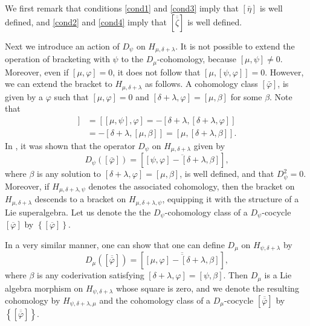 \documentclass[12pt]{amsart}
\theoremstyle{definition}
\begin{document}
We first remark that conditions \eqref{cond1} and \eqref{cond3} imply that
$\left[\bar\eta\right]$ is well defined, and \eqref{cond2} and \eqref{cond4} imply that
${\left[\overline{\overline{\zeta}}\right]}$ is well defined.

Next we introduce an action of $D_\psi$ on ${H_{\mu,\delta+\lambda}}$.
It is not possible to extend the operation of bracketing with $\psi$ to the $D_\mu$-cohomology,
because $[\mu,\psi]\ne0$.  Moreover, even if $[\mu,{\varphi}]=0$, it does not follow that $[\mu,[\psi,{\varphi}]]=0$.
However, we can  extend  the bracket to ${H_{\mu,\delta+\lambda}}$ as follows.
A cohomology class $\left[\bar{\varphi}\right]$, is given by a ${\varphi}$ such that $[\mu,{\varphi}]=0$ and
$[\delta+\lambda,{\varphi}]=[\mu,\beta]$ for some $\beta$. Note that
\begin{align*}
[\mu,[\psi,{\varphi}]]&=[[\mu,\psi],{\varphi}]=-[\delta+\lambda,[\delta+\lambda,{\varphi}]]
\\&=-[\delta+\lambda,[\mu,\beta]]=[\mu,[\delta+\lambda,\beta]].
\end{align*}
In \cite{fp9}, it was shown that the operator $D_{\psi}$ on $H_{\mu,{\delta+\lambda}}$ given by
\begin{equation*}
D_\psi([\bar{\varphi}])=\left[\overline{[\psi,{\varphi}]-[\delta+\lambda,\beta]}\right],
\end{equation*}
where $\beta$ is any solution to $[\delta+\lambda,{\varphi}]=[\mu,\beta]$, is well defined,
and that $D^2_\psi=0$. Moreover, if $H_{\mu,{\delta+\lambda},\psi}$ denotes the associated cohomology,
then the bracket on $H_{\mu,{\delta+\lambda}}$ descends to a bracket on $H_{\mu,{\delta+\lambda},\psi}$, equipping it
with the structure of a Lie superalgebra. Let us denote the
the $D_\psi$-cohomology class of a $D_\psi$-cocycle  ${\left[\overline{{\varphi}}\right]}$ by ${\left\{{\left[\overline{{{\varphi}}}\right]}\right\}}$.

In a very similar manner, one can show that one can define $D_\mu$  on
${H_{\psi,\delta+\lambda}}$ by
$$
D_\mu({\left[\overline{\overline{{\varphi}}}\right]})={\left[\overline{\overline{{[\mu,{\varphi}]-[\delta+\lambda,\beta]}}}\right]},
$$
where $\beta$ is any coderivation satisfying $[\delta+\lambda,{\varphi}]=[\psi,\beta]$. Then $D_\mu$ is a Lie
algebra morphism on ${H_{\psi,\delta+\lambda}}$ whose square is zero, and we denote the resulting  cohomology by ${H_{\psi,\delta+\lambda,\mu}}$
and the cohomology class of a $D_\mu$-cocycle ${\left[\overline{\overline{{\varphi}}}\right]}$ by ${\left\{{\left[\overline{\overline{{{\varphi}}}}\right]}\right\}}$.
\end{document}
